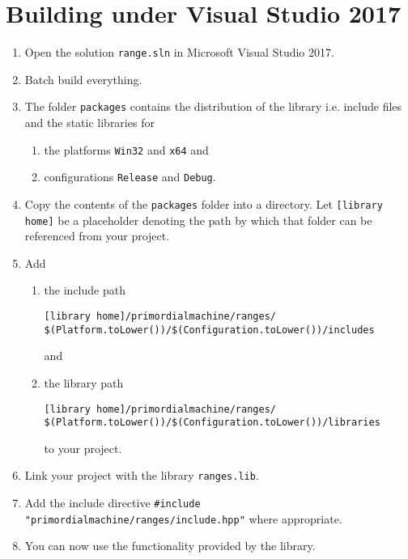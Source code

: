 \documentclass[oneside]{article}
\begin{document}
\section{Building under Visual Studio 2017}
\begin{enumerate}
\item Open the solution \texttt{range.sln} in Microsoft Visual Studio 2017.
\item Batch build everything.
\item The folder \texttt{packages} contains the distribution of the library i.e. include files and the
      static libraries for
  \begin{enumerate}
    \item the platforms \texttt{Win32} and \texttt{x64} and
    \item configurations \texttt{Release} and \texttt{Debug}.
  \end{enumerate}
\item Copy the contents of the \verb+packages+ folder into a directory. Let
      \verb+[library home]+ be a placeholder denoting the path by which that folder
      can be referenced from your project.
\item Add
  \begin{enumerate}
    \item the include path
\begin{verbatim}
[library home]/primordialmachine/ranges/
$(Platform.toLower())/$(Configuration.toLower())/includes
\end{verbatim}
	and
    \item the library path
\begin{verbatim}
[library home]/primordialmachine/ranges/
$(Platform.toLower())/$(Configuration.toLower())/libraries
\end{verbatim}
    to your project.
\end{enumerate}
\item Link your project with the library \verb+ranges.lib+.
\item Add the include directive \verb+#include "primordialmachine/ranges/include.hpp"+ where appropriate.
\item You can now use the functionality provided by the library.
\end{enumerate}
\end{document}
